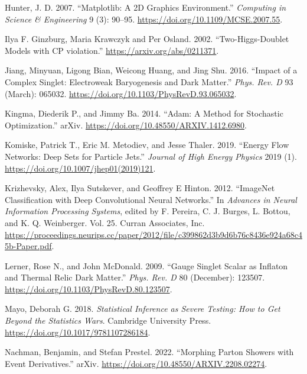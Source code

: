 \documentclass[
  11pt,
  numbers=noendperiod]{book}
\newlength{\cslhangindent}
\newlength{\cslentryspacingunit} %
\newenvironment{CSLReferences}[2] %
 {%
  \setlength{\parindent}{0pt}
  \ifodd #1
  \let\oldpar\par
  \def\par{\hangindent=\cslhangindent\oldpar}
  \fi
  \setlength{\parskip}{#2\cslentryspacingunit}
 }%
 {}
\begin{document}
\begin{CSLReferences}{1}{0}
\leavevmode{}%
Hunter, J. D. 2007. {``Matplotlib: A 2D Graphics Environment.''}
\emph{Computing in Science \& Engineering} 9 (3): 90--95.
\url{https://doi.org/10.1109/MCSE.2007.55}.

\leavevmode{}%
Ilya F. Ginzburg, Maria Krawczyk and Per Osland. 2002.
{``{Two-Higgs-Doublet Models with CP violation}.''}
\url{https://arxiv.org/abs/0211371}.

\leavevmode{}%
Jiang, Minyuan, Ligong Bian, Weicong Huang, and Jing Shu. 2016.
{``Impact of a Complex Singlet: Electroweak Baryogenesis and Dark
Matter.''} \emph{Phys. Rev. D} 93 (March): 065032.
\url{https://doi.org/10.1103/PhysRevD.93.065032}.

\leavevmode{}%
Kingma, Diederik P., and Jimmy Ba. 2014. {``Adam: A Method for
Stochastic Optimization.''} arXiv.
\url{https://doi.org/10.48550/ARXIV.1412.6980}.

\leavevmode{}%
Komiske, Patrick T., Eric M. Metodiev, and Jesse Thaler. 2019. {``Energy
Flow Networks: Deep Sets for Particle Jets.''} \emph{Journal of High
Energy Physics} 2019 (1). \url{https://doi.org/10.1007/jhep01(2019)121}.

\leavevmode{}%
Krizhevsky, Alex, Ilya Sutskever, and Geoffrey E Hinton. 2012.
{``ImageNet Classification with Deep Convolutional Neural Networks.''}
In \emph{Advances in Neural Information Processing Systems}, edited by
F. Pereira, C. J. Burges, L. Bottou, and K. Q. Weinberger. Vol. 25.
Curran Associates, Inc.
\url{https://proceedings.neurips.cc/paper/2012/file/c399862d3b9d6b76c8436e924a68c45b-Paper.pdf}.

\leavevmode{}%
Lerner, Rose N., and John McDonald. 2009. {``Gauge Singlet Scalar as
Inflaton and Thermal Relic Dark Matter.''} \emph{Phys. Rev. D} 80
(December): 123507. \url{https://doi.org/10.1103/PhysRevD.80.123507}.

\leavevmode{}%
Mayo, Deborah G. 2018. \emph{Statistical Inference as Severe Testing:
How to Get Beyond the Statistics Wars}. Cambridge University Press.
\url{https://doi.org/10.1017/9781107286184}.

\leavevmode{}%
Nachman, Benjamin, and Stefan Prestel. 2022. {``Morphing Parton Showers
with Event Derivatives.''} arXiv.
\url{https://doi.org/10.48550/ARXIV.2208.02274}.


\end{CSLReferences}
\end{document}

